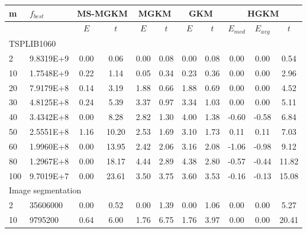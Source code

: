{\footnotesize
\centering
\begin{longtable}{@{}llccccccccc@{}}
\toprule
m   & $f_{best}$ & \multicolumn{2}{c}{MS-MGKM} & \multicolumn{2}{c}{MGKM} & \multicolumn{2}{c}{GKM} & \multicolumn{3}{c}{HGKM}        \\ \midrule
    &            & $E$         & $t$           & $E$       & $t$          & $E$       & $t$         & $E_{med}$ & $E_{avg}$ & $t$     \\
\multicolumn{11}{l}{TSPLIB1060}                                                                                                       \\
2   & 9.8319E+9  & 0.00        & 0.06          & 0.00      & 0.08         & 0.00      & 0.08        & 0.00      & 0.00      & 0.54    \\
10  & 1.7548E+9  & 0.22        & 1.14          & 0.05      & 0.34         & 0.23      & 0.36        & 0.00      & 0.00      & 2.96    \\
20  & 7.9179E+8  & 0.14        & 3.19          & 1.88      & 0.66         & 1.88      & 0.69        & 0.00      & 0.00      & 4.52    \\
30  & 4.8125E+8  & 0.24        & 5.39          & 3.37      & 0.97         & 3.34      & 1.03        & 0.00      & 0.00      & 5.11    \\
40  & 3.4342E+8  & 0.00        & 8.28          & 2.82      & 1.30         & 4.00      & 1.38        & -0.60     & -0.58     & 6.84    \\
50  & 2.5551E+8  & 1.16        & 10.20         & 2.53      & 1.69         & 3.10      & 1.73        & 0.11      & 0.11      & 7.03    \\
60  & 1.9960E+8  & 0.00        & 13.95         & 2.42      & 2.06         & 3.16      & 2.08        & -1.06     & -0.98     & 9.12    \\
80  & 1.2967E+8  & 0.00        & 18.17         & 4.44      & 2.89         & 4.38      & 2.80        & -0.57     & -0.44     & 11.82   \\
100 & 9.7019E+7  & 0.00        & 23.61         & 3.50      & 3.75         & 3.60      & 3.53        & -0.16     & -0.13     & 15.08   \\
\multicolumn{11}{l}{Image segmentation}                                                                                               \\
2   & 35606000   & 0.00        & 0.52          & 0.00      & 1.39         & 0.00      & 1.06        & 0.00      & 0.00      & 5.27    \\
10  & 9795200    & 0.64        & 6.00          & 1.76      & 6.75         & 1.76      & 3.97        & 0.00      & 0.00      & 20.41   \\

\end{longtable}}
